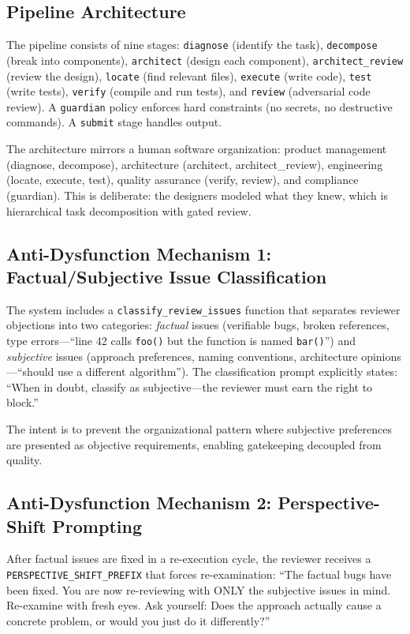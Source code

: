 \documentclass[11pt,a4paper]{article}
\begin{document}
\subsection{Pipeline Architecture}

The pipeline consists of nine stages: \texttt{diagnose} (identify the task), \texttt{decompose} (break into components), \texttt{architect} (design each component), \texttt{architect\_review} (review the design), \texttt{locate} (find relevant files), \texttt{execute} (write code), \texttt{test} (write tests), \texttt{verify} (compile and run tests), and \texttt{review} (adversarial code review). A \texttt{guardian} policy enforces hard constraints (no secrets, no destructive commands). A \texttt{submit} stage handles output.

The architecture mirrors a human software organization: product management (diagnose, decompose), architecture (architect, architect\_review), engineering (locate, execute, test), quality assurance (verify, review), and compliance (guardian). This is deliberate: the designers modeled what they knew, which is hierarchical task decomposition with gated review.

\subsection{Anti-Dysfunction Mechanism 1: Factual/Subjective Issue Classification}

The system includes a \texttt{classify\_review\_issues} function that separates reviewer objections into two categories: \emph{factual} issues (verifiable bugs, broken references, type errors---``line 42 calls \texttt{foo()} but the function is named \texttt{bar()}'') and \emph{subjective} issues (approach preferences, naming conventions, architecture opinions---``should use a different algorithm''). The classification prompt explicitly states: ``When in doubt, classify as subjective---the reviewer must earn the right to block.''

The intent is to prevent the organizational pattern where subjective preferences are presented as objective requirements, enabling gatekeeping decoupled from quality.

\subsection{Anti-Dysfunction Mechanism 2: Perspective-Shift Prompting}

After factual issues are fixed in a re-execution cycle, the reviewer receives a \texttt{PERSPECTIVE\_SHIFT\_PREFIX} that forces re-examination: ``The factual bugs have been fixed. You are now re-reviewing with ONLY the subjective issues in mind. Re-examine with fresh eyes. Ask yourself: Does the approach actually cause a concrete problem, or would you just do it differently?''
\end{document}
